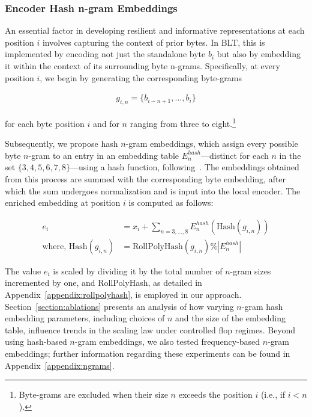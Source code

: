 \subsubsection{Encoder Hash n-gram Embeddings}
\label{sec:ngram-emb}
\label{sec:hash-emb}
An essential factor in developing resilient and informative representations at each position $i$ involves capturing the context of prior bytes. In {\textsc BLT}, this is implemented by encoding not just the standalone byte $b_i$ but also by embedding it within the context of its surrounding byte n-grams. Specifically, at every position $i$, we begin by generating the corresponding byte-grams

\begin{align}
    g_{i,n}=\{b_{i-n + 1},\ldots, b_i\}
\end{align}

for each byte position $i$ and for $n$ ranging from three to eight.\footnote{ Byte-grams are excluded when their size $n$ exceeds the position $i$ (i.e., if $i<n$). }

Subsequently, we propose hash $n$-gram embeddings, which assign every possible byte $n$-gram to an entry in an embedding table $E_{n}^{hash}$—distinct for each $n$ in the set $\{3,4,5,6,7,8\}$—using a hash function, following~\citep{bai2010learning}. The embeddings obtained from this process are summed with the corresponding byte embedding, after which the sum undergoes normalization and is input into the local encoder. The enriched embedding at position $i$ is computed as follows:

\begin{align}
e_i &= x_i + \sum_{n = 3,...,8}E_{n}^{hash}(\text{Hash}(g_{i,n})) \\
\text{where, Hash}(g_{i,n}) &= \text{RollPolyHash}(g_{i,n}) \% |E_{n}^{hash}|
\end{align}

The value $e_i$ is scaled by dividing it by the total number of $n$-gram sizes incremented by one, and RollPolyHash, as detailed in Appendix~\ref{appendix:rollpolyhash}, is employed in our approach. Section~\ref{section:ablations} presents an analysis of how varying $n$-gram hash embedding parameters, including choices of $n$ and the size of the embedding table, influence trends in the scaling law under controlled flop regimes. Beyond using hash-based $n$-gram embeddings, we also tested frequency-based $n$-gram embeddings; further information regarding these experiments can be found in Appendix~\ref{appendix:ngrams}.

